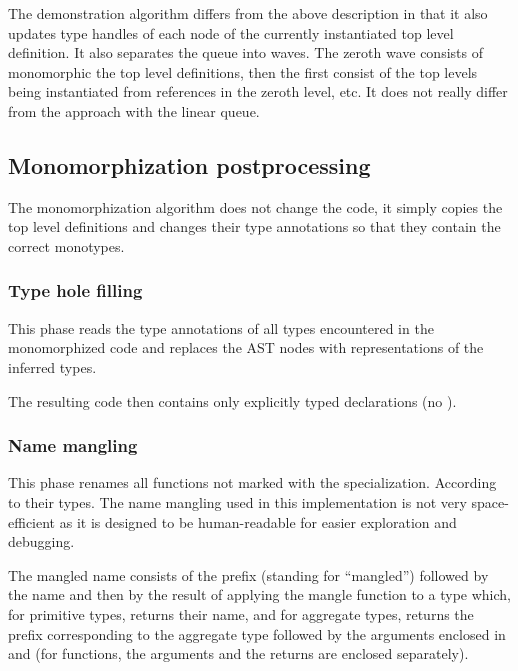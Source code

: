 The demonstration algorithm differs from the above description in that it also updates type handles  of each node of the currently instantiated top level definition. It also separates the queue into waves. The zeroth wave consists of monomorphic the top level definitions, then the first consist of the top levels being instantiated from references in the zeroth level, etc. It does not really differ from the approach with the linear queue. 



\subsection{Monomorphization postprocessing}

The monomorphization algorithm does not change the code, it simply copies the top level definitions and changes their type annotations so that they contain the correct monotypes.

\subsubsection{Type hole filling}

This phase reads the type annotations of all types encountered in the monomorphized code and replaces the AST nodes with representations of the inferred types.

The resulting code then contains only explicitly typed declarations (no ).

\subsubsection{Name mangling}

This phase renames all functions not marked with the  specialization. According to their types. The name mangling used in this implementation is not very space-efficient as it is designed to be human-readable for easier exploration and debugging.

\begin{defn}
    The mangled name consists of the  prefix (standing for ``mangled'') followed by the name and then by the result of applying the mangle function to a type which, for primitive types, returns their name, and for aggregate types, returns the prefix corresponding to the aggregate type followed by the arguments enclosed in  and  (for functions, the arguments and the returns are enclosed separately).
\end{defn}


